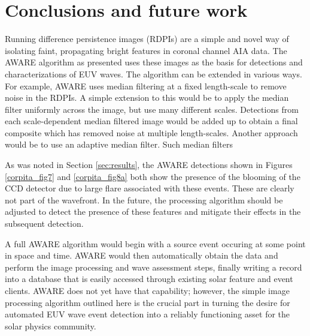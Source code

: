 \section{Conclusions and future work}\label{sec:conclusions}

Running difference persistence images (RDPIs) are a simple and novel
way of isolating faint, propagating bright features in coronal channel
AIA data.  The AWARE algorithm as presented uses these images as the
basis for detections and characterizations of EUV waves.  The
algorithm can be extended in various ways.  For example, AWARE uses
median filtering at a fixed length-scale to remove noise in the RDPIs.
A simple extension to this would be to apply the median filter
uniformly across the image, but use many different scales. Detections
from each scale-dependent median filtered image would be added up to
obtain a final composite which has removed noise at multiple
length-scales.  Another approach would be to use an adaptive median
filter.  Such median filters

As was noted in Section \ref{sec:results}, the AWARE detections shown in
Figures \ref{corpita_fig7} and \ref{corpita_fig8a} both show the
presence of the blooming of the CCD detector due to large flare
associated with these events.  These are clearly not part of the
wavefront.  In the future, the processing algorithm should be adjusted
to detect the presence of these features and mitigate their effects in
the subsequent detection.


A full AWARE algorithm would begin with a source event occuring at
some point in space and time.  AWARE would then automatically obtain
the data and perform the image processing and wave assessment steps,
finally writing a record into a database that is easily accessed
through existing solar feature and event clients.  AWARE does not yet
have that capability; however, the simple image processing algorithm
outlined here is the crucial part in turning the desire for automated
EUV wave event detection into a reliably functioning asset for the
solar physics community.
